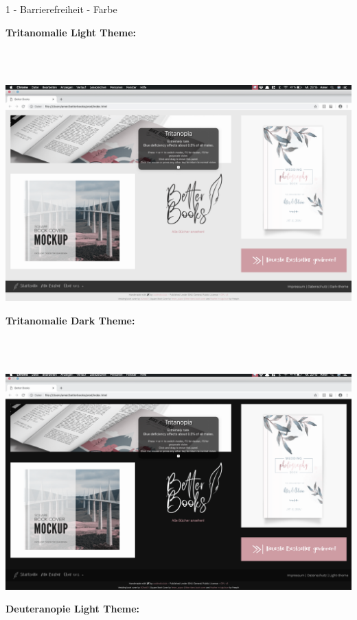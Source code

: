\documentclass[a4paper]{article}
\begin{document}
\begin{exercise}{1 - Barrierefreiheit - Farbe}
\begin{Large}
\textbf{Tritanomalie Light Theme:}
\end{Large}\\\\
\begin{center}
 \includegraphics[scale=0.5]{../6_bookstore_main_tritanomalie_light.png}
 \end{center}
\begin{Large}
\textbf{Tritanomalie Dark Theme:}
\end{Large}\\\\
\begin{center}
 \includegraphics[scale=0.5]{../7_bookstore_main_tritanomalie_dark.png}
 \end{center}
\begin{Large}
\textbf{Deuteranopie Light Theme:}
\end{Large}\\\\

\end{exercise}
\end{document}
